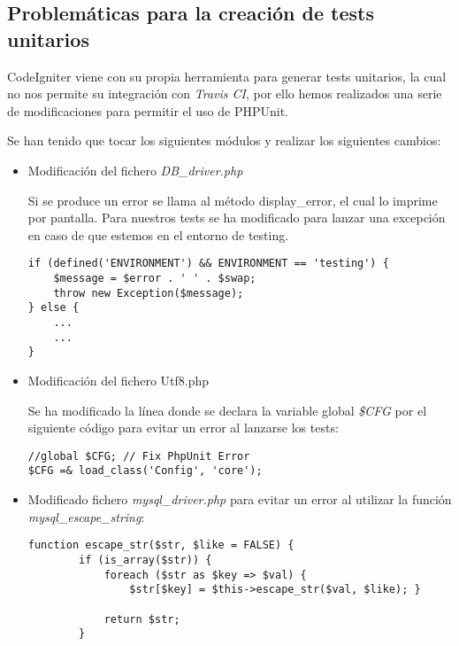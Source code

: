 \subsection{Problemáticas para la creación de tests unitarios}

CodeIgniter viene con su propia herramienta para generar tests unitarios, la cual no nos permite su integración con \emph{Travis CI}, por ello hemos realizados una serie de modificaciones para permitir el uso de PHPUnit.

Se han tenido que tocar los siguientes módulos y realizar los siguientes cambios:

\begin{itemize}

    \item Modificación del fichero \emph{DB\_driver.php}

        Si se produce un error se llama al método display\_error, el cual lo imprime por pantalla. Para nuestros tests se ha modificado para lanzar una excepción en caso de que estemos en el entorno de testing.

                \begin{lstlisting}
if (defined('ENVIRONMENT') && ENVIRONMENT == 'testing') {
    $message = $error . ' ' . $swap;
    throw new Exception($message);
} else {
    ...
    ...
}
                \end{lstlisting}

    \item Modificación del fichero Utf8.php

        Se ha modificado la línea donde se declara la variable global \emph{\$CFG} por el siguiente código para evitar un error al lanzarse los tests:

                \begin{lstlisting}
//global $CFG; // Fix PhpUnit Error
$CFG =& load_class('Config', 'core');
                \end{lstlisting}

    \item Modificado fichero \emph{mysql\_driver.php} para evitar un error al utilizar la función \emph{mysql\_escape\_string}:

                \begin{lstlisting}
function escape_str($str, $like = FALSE) {
        if (is_array($str)) {
            foreach ($str as $key => $val) {
                $str[$key] = $this->escape_str($val, $like); }

            return $str;
        }


\end{lstlisting}
\end{itemize}
